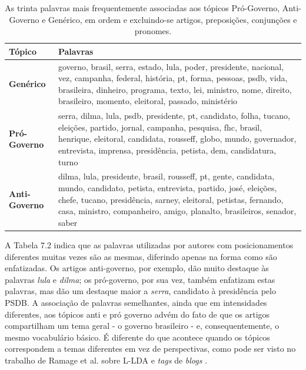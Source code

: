 \begin{table}[h]
\centering
\begin{tabular}{| l | p{10cm} | }
\hline
\textbf{Tópico} & \textbf{Palavras} \\ \hline
\textbf{Genérico} &  governo, brasil, serra, estado, lula, poder, presidente, nacional, vez, campanha, federal, história, pt, forma, pessoas, psdb, vida, brasileira, dinheiro, programa, texto, lei, ministro, nome, direito, brasileiro, momento, eleitoral, passado, ministério \\ \hline
\textbf{Pró-Governo} & serra, dilma, lula, psdb, presidente, pt, candidato, folha, tucano, eleições, partido, jornal, campanha, pesquisa, fhc, brasil, henrique, eleitoral, candidata, rousseff, globo, mundo, governador, entrevista, imprensa, presidência, petista, dem, candidatura, turno\\ \hline
\textbf{Anti-Governo} & dilma, lula, presidente, brasil, rousseff, pt, gente, candidata, mundo, candidato, petista, entrevista, partido, josé, eleições, chefe, tucano, presidência, sarney, eleitoral, petistas, fernando, casa, ministro, companheiro, amigo, planalto, brasileiros, senador, saber \\ \hline
\end{tabular}
\label{tab:palavras}
\caption{As trinta palavras mais frequentemente associadas aos tópicos Pró-Governo, Anti-Governo e Genérico, em ordem e excluindo-se artigos, preposições, conjunções e pronomes.}
\end{table}


A Tabela 7.2 indica que as palavras utilizadas por autores com posicionamentos diferentes muitas vezes são as mesmas, diferindo apenas na forma como são enfatizadas. Os artigos anti-governo, por exemplo, dão muito destaque às palavras \emph{lula} e \emph{dilma}; os pró-governo, por sua vez, também enfatizam estas palavras, mas dão um destaque maior a \emph{serra}, candidato à presidência pelo PSDB. A associação de palavras semelhantes, ainda que em intensidades diferentes, aos tópicos anti e pró governo advém do fato de que os artigos compartilham um tema geral - o governo brasileiro - e, consequentemente, o mesmo vocabulário básico. É diferente do que acontece quando os tópicos correspondem a temas diferentes em vez de perspectivas, como pode ser visto no trabalho de Ramage et al. sobre L-LDA e \emph{tags} de \emph{blogs} \cite{llda}.


